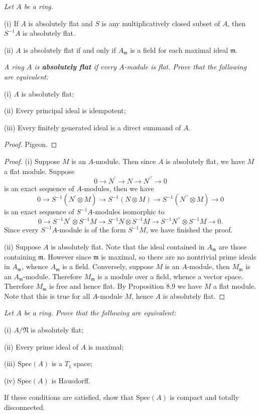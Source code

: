 \begin{problem}\em
Let $A$ be a ring.\par
(i) If $A$ is absolutely flat and $S$ is any multiplicatively closed subset of $A$, then $S^{-1}A$ is absolutely flat.\par
(ii) $A$ is absolutely flat if and only if $A_\mathfrak{m}$ is a field for each maximal ideal $\mathfrak{m}$.
\end{problem}
\begin{problem}\em
A ring $A$ is \textbf{absolutely flat} if every $A$-module is flat. Prove that the following are equivalent: \par
(i) $A$ is absolutely flat;\par
(ii) Every principal ideal is idempotent;\par
(iii) Every finitely generated ideal is a direct summand of $A$.
\end{problem}
\begin{proof}
Pigeon.
\end{proof}
\begin{proof}
(i) Suppose $M$ is an $A$-module. Then since $A$ is absolutely flat, we have $M$ a flat module. Suppose 
$$
0\longrightarrow N^{\prime}\longrightarrow N\longrightarrow N^{\prime\prime}\longrightarrow 0
$$
is an exact sequence of $A$-modules, then we have 
$$
0\longrightarrow S^{-1}\left( N^{\prime}\otimes M \right) \longrightarrow S^{-1}\left( N\otimes M \right) \longrightarrow S^{-1}\left( N^{\prime\prime}\otimes M \right) \longrightarrow 0
$$
is an exact sequence of $S^{-1}A$-modules isomorphic to 
$$
0\longrightarrow S^{-1}N^{\prime}\otimes S^{-1}M\longrightarrow S^{-1}N\otimes S^{-1}M\longrightarrow S^{-1}N^{\prime\prime}\otimes S^{-1}M\longrightarrow 0.
$$
Since every $S^{-1}A$-module is of the form $S^{-1}M$, we have finished the proof.\par
(ii) Suppose $A$ is absolutely flat. Note that the ideal contained in $A_\mathfrak{m}$ are those containing $\mathfrak{m}$. However since $\mathfrak{m}$ is maximal, so there are no nontrivial prime ideals in $A_\mathfrak{m}$, whence $A_\mathfrak{m}$ is a field. Conversely, suppose $M$ is an $A$-module, then $M_\mathfrak{m}$ is an $A_\mathfrak{m}$-module. Therefore $M_\mathfrak{m}$ is a module over a field, whence a vector space. Therefore $M_\mathfrak{m}$ is free and hence flat. By Proposition 8.9 we have $M$ a flat module. Note that this is true for all $A$-module $M$, hence $A$ is absolutely flat.
\end{proof}
\begin{problem}\em
Let $A$ be a ring. Prove that the following are equivalent:\par
(i) $A/\mathfrak{N}$ is absolutely flat;\par
(ii) Every prime ideal of $A$ is maximal;\par
(iii) $\mathrm{Spec}(A)$ is a $T_1$ space;\par
(iv) $\mathrm{Spec}(A)$ is Hausdorff.\par
If these conditions are satisfied, show that $\mathrm{Spec}(A)$ is compact and totally disconnected.
\end{problem}
